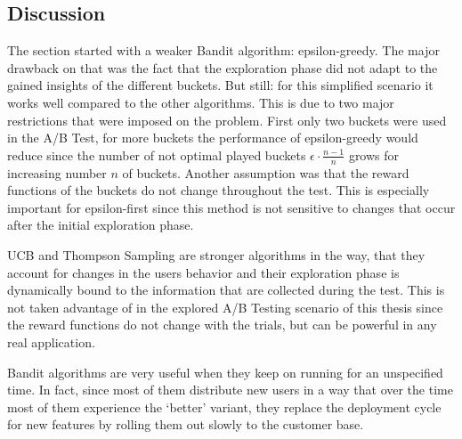 \documentclass[main.tex]{subfiles}
\begin{document}
\subsection{Discussion}
The section started with a weaker Bandit algorithm: epsilon-greedy. The major drawback on that was the fact that the exploration phase did not adapt to the gained insights of the different buckets. But still: for this simplified scenario it works well compared to the other algorithms. This is due to two major restrictions that were imposed on the problem. First only two buckets were used in the A/B Test, for more buckets the performance of epsilon-greedy would reduce since the number of not optimal played buckets $\epsilon \cdot \frac{n-1}{n}$ grows for increasing number $n$ of buckets. Another assumption was that the reward functions of the buckets do not change throughout the test. This is especially important for epsilon-first since this method is not sensitive to changes that occur after the initial exploration phase.

UCB and Thompson Sampling are stronger algorithms in the way, that they account for changes in the users behavior and their exploration phase is dynamically bound to the information that are collected during the test. This is not taken advantage of in the explored A/B Testing scenario of this thesis since the reward functions do not change with the trials, but can be powerful in any real application.

Bandit algorithms are very useful when they keep on running for an unspecified time. In fact, since most of them distribute new users in a way that over the time most of them experience the `better' variant, they replace the deployment cycle for new features by rolling them out slowly to the customer base.
\end{document}
